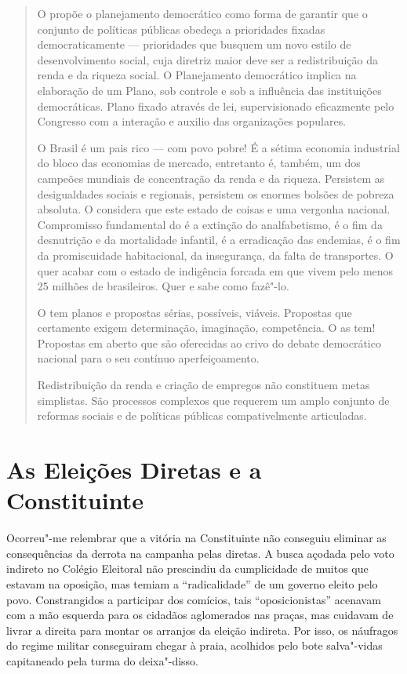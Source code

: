 \begin{quote}
O  propõe o planejamento democrático como forma de garantir que o
conjunto de políticas públicas obedeça a prioridades fixadas
democraticamente --- prioridades que busquem um novo estilo de
desenvolvimento social, cuja diretriz maior deve ser a redistribuição da
renda e da riqueza social. O Planejamento democrático implica na
elaboração de um Plano, sob controle e sob a influência das
instituições democráticas. Plano fixado através de lei, supervisionado eficazmente
pelo Congresso com a interação e auxilio das organizações populares.

O Brasil é um pais rico --- com povo pobre! É a sétima economia
industrial do bloco das economias de mercado, entretanto é, também, um
dos campeões mundiais de concentração da renda e da riqueza. Persistem
as desigualdades sociais e regionais, persistem os enormes bolsões de
pobreza absoluta. O  considera que este estado de coisas e uma
vergonha nacional. Compromisso fundamental do  é a extinção do
analfabetismo, é o fim da desnutrição e da mortalidade infantil, é a
erradicação das endemias, é o fim da promiscuidade habitacional, da
insegurança, da falta de transportes. O  quer acabar com o estado de
indigência forcada em que vivem pelo menos 25 milhões de brasileiros.
Quer e sabe como fazê"-lo.

O  tem planos e propostas sérias,
possíveis, viáveis. Propostas que certamente exigem determinação,
imaginação, competência. O  as tem! Propostas em aberto que são
oferecidas ao crivo do debate democrático nacional para o seu contínuo
aperfeiçoamento.

Redistribuição da renda e criação de empregos não
constituem metas simplistas. São processos complexos que requerem um
amplo conjunto de reformas sociais e de políticas públicas
compativelmente articuladas.
\end{quote}

\section{As Eleições Diretas e a Constituinte}

Ocorreu"-me relembrar que a vitória na Constituinte não conseguiu
eliminar as consequências da derrota na campanha pelas diretas. A busca
açodada pelo voto indireto no Colégio Eleitoral não prescindiu da
cumplicidade de muitos que estavam na oposição, mas temiam a
``radicalidade'' de um governo eleito pelo povo. Constrangidos a
participar dos comícios, tais ``oposicionistas'' acenavam com a mão
esquerda para os cidadãos aglomerados nas praças, mas cuidavam de livrar
a direita para montar os arranjos da eleição indireta. Por isso, os
náufragos do regime militar conseguiram chegar à praia, acolhidos pelo
bote salva"-vidas capitaneado pela turma do deixa"-disso.

